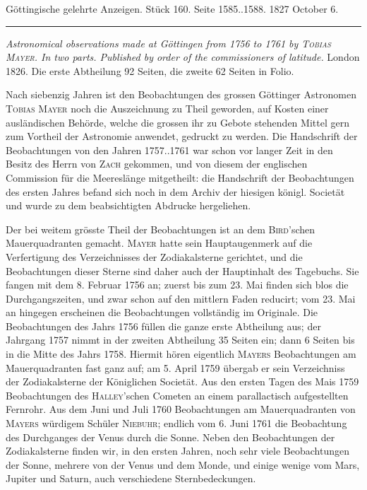 \clearpage
{}
\hypertarget{native-649-lower}{}
\begin{center}\small Göttingische gelehrte Anzeigen. Stück 160. Seite 1585..1588. 1827 October 6.\\[3pt]\rule{.72\linewidth}{.3pt}\end{center}

\emph{Astronomical observations made at Göttingen from \textup{1756} to \textup{1761} by \textup{\textsc{Tobias Mayer}}. In two parts. Published by order of the commissioners of latitude.} London 1826. Die erste Abtheilung 92 Seiten, die zweite 62 Seiten in Folio.

Nach siebenzig Jahren ist den Beobachtungen des grossen Göttinger Astronomen \textsc{Tobias Mayer} noch die Auszeichnung zu Theil geworden, auf Kosten einer ausländischen Behörde, welche die grossen ihr zu Gebote stehenden Mittel gern zum Vortheil der Astronomie anwendet, gedruckt zu werden. Die Handschrift der Beobachtungen von den Jahren 1757..1761 war schon vor langer Zeit in den Besitz des Herrn von \textsc{Zach} gekommen, und von diesem der englischen Commission für die Meereslänge mitgetheilt: die Handschrift der Beobachtungen des ersten Jahres befand sich noch in dem Archiv der hiesigen königl. Societät und wurde zu dem beabsichtigten Abdrucke hergeliehen.

Der bei weitem grösste Theil der Beobachtungen ist an dem \textsc{Bird}'schen Mauerquadranten gemacht. \textsc{Mayer} hatte sein Hauptaugenmerk auf die Verfertigung des Verzeichnisses der Zodiakalsterne gerichtet, und die Beobachtungen dieser Sterne sind daher auch der Hauptinhalt des Tagebuchs. Sie fangen mit dem 8. Februar 1756 an; zuerst bis zum 23. Mai finden sich blos die Durchgangszeiten, und zwar schon auf den mittlern Faden reducirt; vom 23. Mai an hingegen erscheinen die Beobachtungen vollständig im Originale. Die Beobachtungen des Jahrs 1756 füllen die ganze erste Abtheilung aus; der Jahrgang 1757 nimmt in der zweiten Abtheilung 35 Seiten ein; dann 6 Seiten bis in die Mitte des Jahrs 1758. Hiermit hören eigentlich \textsc{Mayers} Beobachtungen am Mauerquadranten fast ganz auf; am 5. April 1759 übergab er sein Verzeichniss der Zodiakalsterne der Königlichen Societät. Aus den ersten Tagen des Mais 1759 Beobachtungen des \textsc{Halley}'schen Cometen an einem parallactisch aufgestellten Fernrohr. Aus dem Juni und Juli 1760 Beobachtungen am Mauerquadranten von \textsc{Mayers} würdigem Schüler \textsc{Niebuhr}; endlich vom 6. Juni 1761 die Beobachtung des Durchganges der Venus durch die Sonne. Neben den Beobachtungen der Zodiakalsterne finden wir, in den ersten Jahren, noch sehr viele Beobachtungen der Sonne, mehrere von der Venus und dem Monde, und einige wenige vom Mars, Jupiter und Saturn, auch verschiedene Sternbedeckungen.

